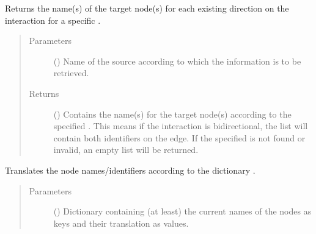 \documentclass[letterpaper,10pt,english]{sphinxmanual}
\begin{document}
\begin{fulllineitems}
\begin{fulllineitems}
\begin{quote}
\begin{description}
\end{description}\end{quote}

\end{fulllineitems}


\begin{fulllineitems}
\label{\detokenize{main:pypath.main.Direction.tgt_by_source}}
Returns the name(s) of the target node(s) for each existing
direction on the interaction for a specific .
\begin{quote}\begin{description}
\item[{Parameters}] \leavevmode
{} () \textendash{} Name of the source according to which the information is to
be retrieved.

\item[{Returns}] \leavevmode
() \textendash{} Contains the name(s) for the target node(s)
according to the specified . This means if the
interaction is bidirectional, the list will contain both
identifiers on the edge. If the specified  is not
found or invalid, an empty list will be returned.

\end{description}\end{quote}

\end{fulllineitems}


\begin{fulllineitems}
\label{\detokenize{main:pypath.main.Direction.translate}}
Translates the node names/identifiers according to the
dictionary .
\begin{quote}\begin{description}
\item[{Parameters}] \leavevmode
{} () \textendash{} Dictionary containing (at least) the current names of the
nodes as keys and their translation as values.


\end{description}
\end{quote}
\end{fulllineitems}
\end{fulllineitems}
\end{document}
